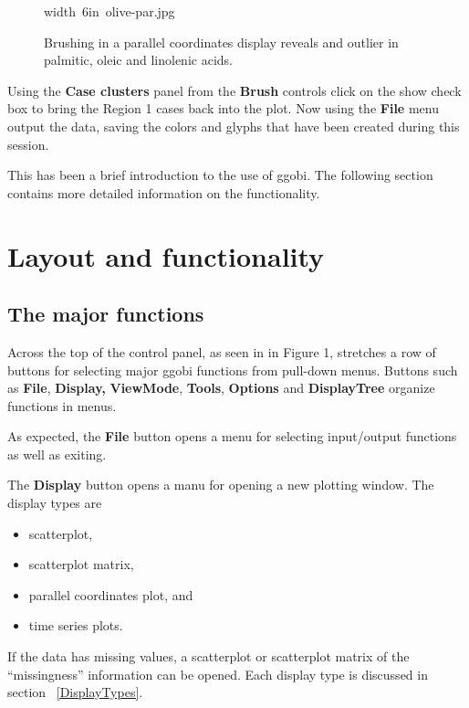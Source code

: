 \documentclass[11pt]{article}
\begin{document}
\begin{figure}[htp]
\hbox{\pdfimage width 6in {olive-par.jpg}}
\caption{Brushing in a parallel coordinates display reveals and outlier in 
palmitic, oleic and linolenic acids.}
\label{fig7}
\end{figure}

Using the {\bf Case clusters} panel from the {\bf Brush} controls
click on the show check box to bring the Region 1 cases back into the
plot. Now using the {\bf File} menu output the data, saving the colors
and glyphs that have been created during this session.

This has been a brief introduction to the use of ggobi. The following
section contains more detailed information on the functionality.

\section{Layout and functionality}

\subsection{The major functions}

Across the top of the control panel, as seen in in Figure 1,
stretches a row of buttons for selecting major ggobi functions from
pull-down menus.  Buttons such as {\bf File}, {\bf Display,} {\bf
ViewMode}, {\bf Tools}, {\bf Options} and {\bf DisplayTree} organize
functions in menus.

As expected, the {\bf File} button opens a menu for selecting
input/output functions as well as exiting.

The {\bf Display} button opens a manu for opening a new plotting
window.  The display types are
\begin{itemize}
\itemsep 0em
\item scatterplot,
\item scatterplot matrix, 
\item parallel coordinates plot, and
\item time series plots.
\end{itemize}

If the data has missing values, a scatterplot or scatterplot matrix
of the ``missingness'' information can be opened.  Each display type
is discussed in section ~\ref{DisplayTypes}.
\end{document}
